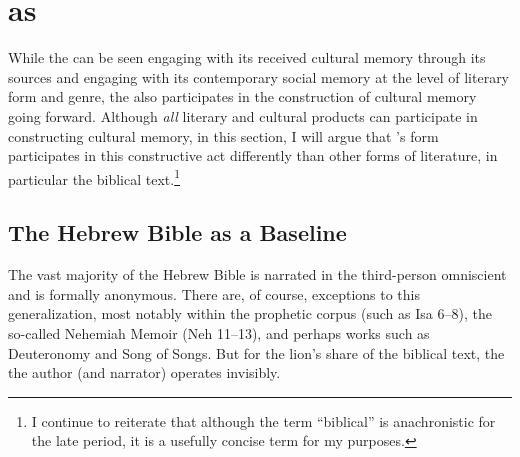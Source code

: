 
\section{\ga as \psa}

While the \ga can be seen engaging with its received cultural memory through its sources and engaging with its contemporary social memory at the level of literary form and genre, the \ga also participates in the construction of cultural memory going forward. Although \emph{all} literary and cultural products can participate in constructing cultural memory, in this section, I will argue that \ga's \psgraphic form participates in this constructive act differently than other forms of literature, in particular the biblical text.\footnote{I continue to reiterate that although the term ``biblical'' is anachronistic for the late \secondtemple period, it is a usefully concise term for my purposes.}

\subsection{The Hebrew Bible as a Baseline}

The vast majority of the Hebrew Bible is narrated in the third-person omniscient and is formally anonymous. There are, of course, exceptions to this generalization, most notably within the prophetic corpus (such as Isa 6--8), the so-called Nehemiah Memoir (Neh 11--13), and perhaps works such as Deuteronomy and Song of Songs. But for the lion's share of the biblical text, the the author (and narrator) operates invisibly.

